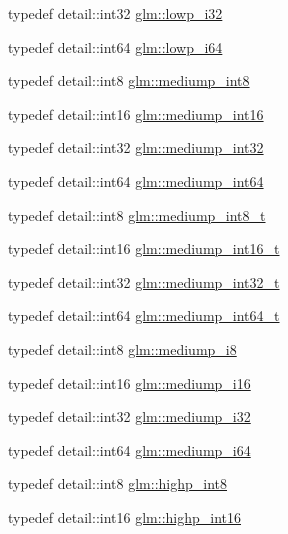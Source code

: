 \begin{DoxyCompactItemize}
typedef detail\-::int32 \hyperlink{group__gtc__type__precision_ga70fd34e8b8cffc92739161284ed77328}{glm\-::lowp\-\_\-i32}
\item 
typedef detail\-::int64 \hyperlink{group__gtc__type__precision_ga1f4ded25f71c0f3b4518936d50b54b6e}{glm\-::lowp\-\_\-i64}
\item 
typedef detail\-::int8 \hyperlink{group__gtc__type__precision_ga3ee8faab2278c44c5785af04b7b18a14}{glm\-::mediump\-\_\-int8}
\item 
typedef detail\-::int16 \hyperlink{group__gtc__type__precision_ga4611997edb6c61606daa11990cf08798}{glm\-::mediump\-\_\-int16}
\item 
typedef detail\-::int32 \hyperlink{group__gtc__type__precision_ga0660a752402702f420f13c686a7fff29}{glm\-::mediump\-\_\-int32}
\item 
typedef detail\-::int64 \hyperlink{group__gtc__type__precision_ga603c695fe5cd677d3f72a81343e19a74}{glm\-::mediump\-\_\-int64}
\item 
typedef detail\-::int8 \hyperlink{group__gtc__type__precision_ga626ac5f73d3538e62a879d6c56abfb36}{glm\-::mediump\-\_\-int8\-\_\-t}
\item 
typedef detail\-::int16 \hyperlink{group__gtc__type__precision_ga478fab608cf43040013d719a3e03b194}{glm\-::mediump\-\_\-int16\-\_\-t}
\item 
typedef detail\-::int32 \hyperlink{group__gtc__type__precision_gafd9b4bd9e4465aec63351b59100692c4}{glm\-::mediump\-\_\-int32\-\_\-t}
\item 
typedef detail\-::int64 \hyperlink{group__gtc__type__precision_ga555a2f85641550c232db473a9bb981f7}{glm\-::mediump\-\_\-int64\-\_\-t}
\item 
typedef detail\-::int8 \hyperlink{group__gtc__type__precision_ga28a8b5fd51072680bb55178c17cc7411}{glm\-::mediump\-\_\-i8}
\item 
typedef detail\-::int16 \hyperlink{group__gtc__type__precision_ga8454fc6a82c7bb787d0ac9663e08f63d}{glm\-::mediump\-\_\-i16}
\item 
typedef detail\-::int32 \hyperlink{group__gtc__type__precision_ga5e00ec824eb55968a6b6496f294d8c07}{glm\-::mediump\-\_\-i32}
\item 
typedef detail\-::int64 \hyperlink{group__gtc__type__precision_ga90fedf6c701ffbe00535156715e50787}{glm\-::mediump\-\_\-i64}
\item 
typedef detail\-::int8 \hyperlink{group__gtc__type__precision_ga57c86999e666760c304453f9bfdc09d1}{glm\-::highp\-\_\-int8}
\item 
typedef detail\-::int16 \hyperlink{group__gtc__type__precision_gaf0430ed80e88c0d1dfbe47f359659c81}{glm\-::highp\-\_\-int16}

\end{DoxyCompactItemize}
